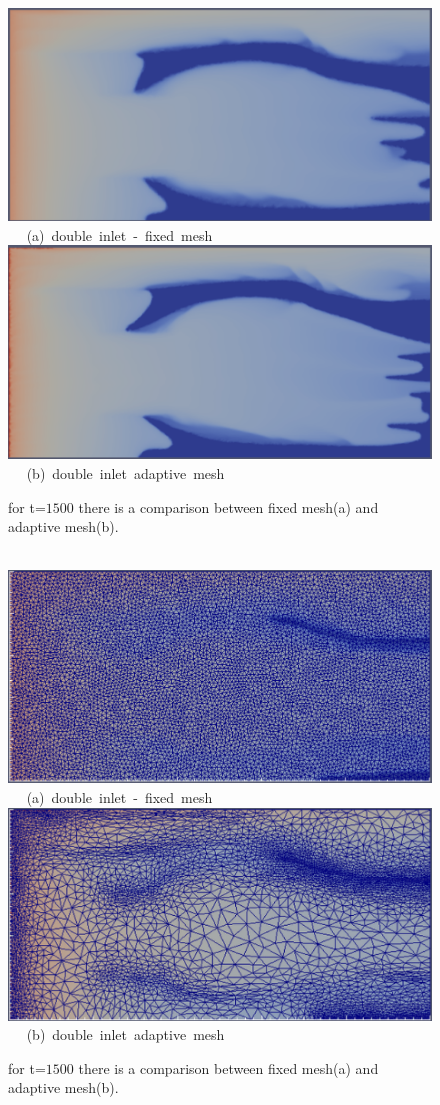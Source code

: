 \begin{figure}[ht] 
\vbox{
\hbox{\hspace{3.5cm}
\includegraphics[width=.5\textwidth]{./Pics1/5reg_dinlet_fixed_1500.pdf} 
}
\vspace{0.0cm}
\hbox{\hspace{5.0cm} (a) double inlet - fixed mesh   
}
\hbox{\hspace{3.5cm}
\includegraphics[width=.5\textwidth]{./Pics1/5reg_dinlet_adapt_1500.pdf}
}
\vspace{0.0cm}
\hbox{\hspace{5.0cm} (b) double inlet adaptive mesh   
}
}     
\caption{for t=$1500$ there is a comparison between fixed mesh(a) and adaptive mesh(b).}
\label{fig:3testcase_c}
\end{figure}




\begin{figure}[ht] 
\vbox{
\hbox{\hspace{3.5cm}
\includegraphics[width=.5\textwidth]{./Pics1/5reg_dinlet_fixed_end.pdf} 
}
\vspace{0.0cm}
\hbox{\hspace{5.0cm} (a) double inlet - fixed mesh   
}
\hbox{\hspace{3.5cm}
\includegraphics[width=.5\textwidth]{./Pics1/5reg_dinlet_adapt_end.pdf}
}
\vspace{0.0cm}
\hbox{\hspace{5.0cm} (b) double inlet adaptive mesh   
}
}     
\caption{for t=$1500$ there is a comparison between fixed mesh(a) and adaptive mesh(b).}
\label{fig:3testcase_d}
\end{figure}




